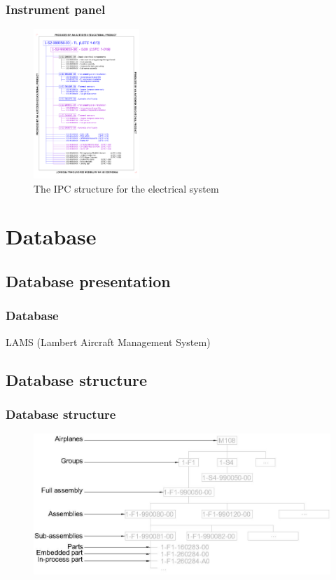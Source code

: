 \documentclass{beamer}
\begin{document}
\begin{frame}\frametitle{Instrument panel}
\begin{figure}[ht!]
	\begin{center}
		\includegraphics[width=4cm,trim = 1.9cm 2.4cm 1.9cm 2.4cm, clip]{pics/PIC015.pdf}
		\caption{The IPC structure for the electrical system}
		\label{fig:PIC015}
	\end{center}
\end{figure}
\end{frame}

\section{Database}
\subsection{Database presentation}

\begin{frame}\frametitle{Database}
LAMS (Lambert Aircraft Management System)
\end{frame}

\subsection{Database structure}
\begin{frame}\frametitle{Database structure}
\begin{figure}[ht!]
	\begin{center}
		\includegraphics[width=11.5cm]{pics/PIC024.jpg}
		\label{fig:PIC024}
	\end{center}
\end{figure}
\end{frame}
\end{document}
